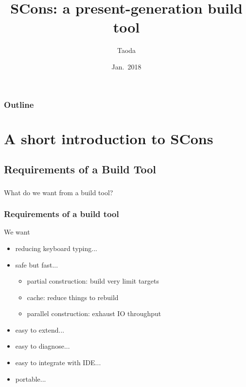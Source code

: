 \documentclass[lualatex]{beamer}
\title[SCons]{SCons: a present-generation build tool}
\author{Taoda}
\institute{Alibaba Cloud}
\date{Jan.\ 2018}
\begin{document}
\begin{frame}
\titlepage
\end{frame}

\begin{frame}
  \frametitle{Outline}
  \tableofcontents
\end{frame}

\section{A short introduction to SCons}

\subsection{Requirements of a Build Tool}

\begin{frame}
  \frametitle{}

  \begin{center}
    \Large
    What do we want from a build tool?
  \end{center}
\end{frame}

\begin{frame}
  \frametitle{Requirements of a build tool}

  \begin{block}{We want}
    \begin{itemize}
    \item reducing keyboard typing...
    \item<2-> safe but fast...
      \begin{itemize}
      \item partial construction: build very limit targets
      \item cache: reduce things to rebuild
      \item parallel construction: exhaust IO throughput
      \end{itemize}
    \item<3-> easy to extend...
    \item<4-> easy to diagnose...
    \item<5-> easy to integrate with IDE...
    \item<6-> portable...
    \end{itemize}
  \end{block}
\end{frame}
\end{document}
